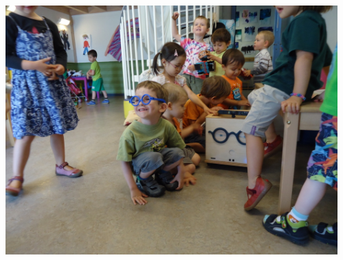 \documentclass[xcolor=table]{beamer}
\begin{document}
\begin{frame}
\begin{columns}
\begin{column}{0.7\linewidth}
{            }
        \end{column}
        \begin{column}{0.35\linewidth}
            \begin{center}
                \includegraphics[trim=15cm 0 11cm 0,clip,width=\linewidth]{ranger/ranger_funny_glasses}
            \end{center}
        \end{column}
    \end{columns}

\end{frame}
\end{document}

